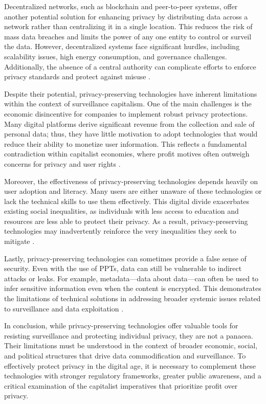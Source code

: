 Decentralized networks, such as blockchain and peer-to-peer systems, offer another potential solution for enhancing privacy by distributing data across a network rather than centralizing it in a single location. This reduces the risk of mass data breaches and limits the power of any one entity to control or surveil the data. However, decentralized systems face significant hurdles, including scalability issues, high energy consumption, and governance challenges. Additionally, the absence of a central authority can complicate efforts to enforce privacy standards and protect against misuse \cite[pp.~85-88]{narayanan2016bitcoin}.

Despite their potential, privacy-preserving technologies have inherent limitations within the context of surveillance capitalism. One of the main challenges is the economic disincentive for companies to implement robust privacy protections. Many digital platforms derive significant revenue from the collection and sale of personal data; thus, they have little motivation to adopt technologies that would reduce their ability to monetize user information. This reflects a fundamental contradiction within capitalist economies, where profit motives often outweigh concerns for privacy and user rights \cite[pp.~112-115]{noble2019algorithms}.

Moreover, the effectiveness of privacy-preserving technologies depends heavily on user adoption and literacy. Many users are either unaware of these technologies or lack the technical skills to use them effectively. This digital divide exacerbates existing social inequalities, as individuals with less access to education and resources are less able to protect their privacy. As a result, privacy-preserving technologies may inadvertently reinforce the very inequalities they seek to mitigate \cite[pp.~45-47]{eubanks2018automating}.

Lastly, privacy-preserving technologies can sometimes provide a false sense of security. Even with the use of PPTs, data can still be vulnerable to indirect attacks or leaks. For example, metadata—data about data—can often be used to infer sensitive information even when the content is encrypted. This demonstrates the limitations of technical solutions in addressing broader systemic issues related to surveillance and data exploitation \cite[pp.~56-58]{schneier2015data}.

In conclusion, while privacy-preserving technologies offer valuable tools for resisting surveillance and protecting individual privacy, they are not a panacea. Their limitations must be understood in the context of broader economic, social, and political structures that drive data commodification and surveillance. To effectively protect privacy in the digital age, it is necessary to complement these technologies with stronger regulatory frameworks, greater public awareness, and a critical examination of the capitalist imperatives that prioritize profit over privacy.

